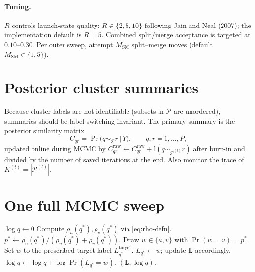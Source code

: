 \documentclass[11pt]{article}
\newcommand{\ind}{\mathbb I}
\begin{document}
\paragraph{Tuning.}
$R$ controls launch-state quality: $R\in\{2,5,10\}$ following Jain and Neal
(2007); the implementation default is $R=5$.  Combined split/merge
acceptance is targeted at $0.10$--$0.30$.  Per outer sweep, attempt
$M_{\mathrm{SM}}$ split--merge moves (default $M_{\mathrm{SM}}\in\{1,5\}$).

\section{Posterior cluster summaries}

Because cluster labels are not identifiable (subsets in $\mathcal{P}$ are
unordered), summaries should be label-switching invariant.  The primary
summary is the posterior similarity matrix
\begin{equation}
    C_{qr}=\Pr\bigl(q\sim_{\mathcal{P}}r\,\big|\,Y\bigr),
    \qquad q,r=1,\dots,P,
\end{equation}
updated online during MCMC by
$C_{qr}^{\mathrm{raw}}\leftarrow C_{qr}^{\mathrm{raw}}+\ind(q\sim_{\mathcal{P}^{(t)}}r)$
after burn-in and divided by the number of saved iterations at the end.
Also monitor the trace of $K^{(t)}=|\mathcal{P}^{(t)}|$.

\section{One full MCMC sweep}

\begin{algorithm}[H]
\caption{One restricted Gibbs scan
$\textsc{RGibbsScan}(\mathbf{L},\mathcal{S}^*,u,v,\sigma,z,\alpha,\delta,\tau,\mathcal{P}_{-\mathcal{S}})$.
Returns the updated restricted partition and the log-probability of the
sampled path (or, in scoring mode, of a forced path).}
\small
\begin{algorithmic}[1]
\State $\log q\gets 0$
    \State Compute $\rho_u(q^*),\rho_v(q^*)$ via \eqref{eq:rho-defn}.
    \State $p^*\gets\rho_u(q^*)/(\rho_u(q^*)+\rho_v(q^*))$.
        \State Draw $w\in\{u,v\}$ with $\Pr(w=u)=p^*$.
        \State Set $w$ to the prescribed target label $L_{q^*}^{\mathrm{target}}$.
    \EndIf
    \State $L_{q^*}\gets w$;
    update $\mathbf{L}$ accordingly.
    \State $\log q\gets\log q+\log\Pr(L_{q^*}=w)$.
\EndFor
\State \Return $(\mathbf{L},\log q)$.
\end{algorithmic}
\end{algorithm}
\end{document}
